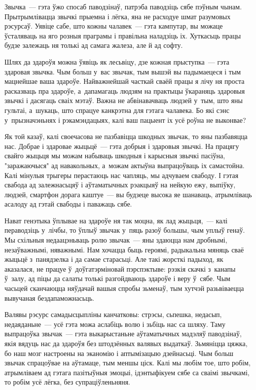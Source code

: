 Звычка~--- гэта ўжо спосаб паводзінаў, патрэба паводзіць сябе пэўным чынам. Прытрымлівацца звычкі прыемна і лёгка, яна не расходуе шмат разумовых рэсурсаў. Уявіце сабе, што кожны чалавек~--- гэта кампутар, вы можаце ўсталяваць на яго розныя праграмы і правільна наладзіць іх. Хуткасьць працы будзе залежаць ня толькі ад самага жалеза, але й ад софту.

Шлях да здароўя можна ўявіць як лесьвіцу, дзе кожная прыступка~--- гэта здаровая звычка. Чым больш у~вас звычак, тым вышэй вы падымаецеся і тым мацнейшае ваша здароўе. Найважнейшай часткай сваёй працы я лічу ня проста расказваць пра здароўе, а~дапамагаць людзям на практыцы ўкараняць здаровыя звычкі і дасягаць сваіх мэтаў. Важна не абвінавачваць людзей у~тым, што яны гультаі, а~шукаць, што спрацуе канкрэтна для гэтага чалавека. Бо які сэнс у~прызначэньнях і рэкамэндацыях, калі ваш пацыент іх усё роўна не выконвае?

Як той казаў, калі своечасова не пазбавіцца шкодных звычак, то яны пазбавяцца нас. Добрае і здаровае жыцьцё~--- гэта добрыя і здаровыя звычкі. На працягу свайго жыцьця мы можам набываць шкодныя і карысныя звычкі пасіўна, "заражаючыся" ад навакольных, а~можам актыўна выпрацоўваць іх самастойна. Калі мінулыя трыгеры перастаюць нас чапляць, мы адчуваем свабоду. І гэтая свабода ад залежнасьцяў і аўтаматычных рэакцыяў на нейкую ежу, выпіўку, людзей, смартфон дорага каштуе~--- вы будзеце высока яе шанаваць, атрымліваць асалоду ад гэтай свабоды і паважаць сябе.

Нават генэтыка ўплывае на здароўе ня так моцна, як лад жыцьця,~--- калі пераводзіць у~лічбы, то ўплыў звычак у~пяць разоў большы, чым уплыў генаў. Мы схільныя недаацэньваць ролю звычак~--- яны здаюцца нам дробнымі, незаўважнымі, няважнымі. Нам хочацца быць героямі, радыкальна мяняць сваё жыцьцё з~панядзелка і да самае старасьці. Але такі жорсткі падыход, як аказалася, не працуе ў~доўгатэрміновай пэрспэктыве: рэзкія скачкі з~канапы ў~залу, ад піцы да салаты толькі разгойдваюць здароўе і веру ў~сябе. Чым часьцей сканчаюцца няўдачай вашыя спробы зьменаў, тым хутчэй разьвіваецца вывучаная бездапаможнасьць.

Валявы рэсурс самадысцыпліны канчатковы: стрэсы, сьпешка, недасып, недаяданьне~--- усё гэта можа аслабіць волю і зьбіць нас са шляху. Таму выпрацоўка звычак~--- гэта выкарыстаньне аўтаматычных мадэляў паводзінаў, якія вядуць нас да здароўя без штодзённых валявых выдаткаў. Зьмяніцца цяжка, бо наш мозг настроены на эканомію і аптымізацыю дзейнасьці. Чым больш звычак спрацоўвае на аўтамаце, тым меншы ціск. Калі мы любім тое, што робім, атрымліваем ад гэтага пазітыўныя эмоцыі, ідэнтыфікуем сябе са сваімі звычкамі, то робім усё лёгка, без супраціўленьняня.

